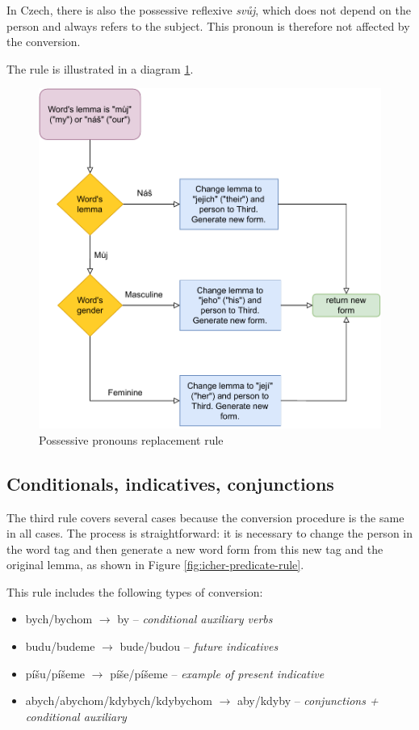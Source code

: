 In Czech, there is also the possessive reflexive \emph{svůj}, which does not depend on the person and always refers to the subject. \cite{Karlik2017} This pronoun is therefore not affected by the conversion.

The rule is illustrated in a diagram \ref{fig:icher-posspron-rule}.

\begin{figure}[!htbp]
\includegraphics[width=\textwidth]{data/Icher-Posspron-Rule.pdf}
\caption{Possessive pronouns replacement rule}
\label{fig:icher-posspron-rule}
\end{figure}

\subsection{Conditionals, indicatives, conjunctions}

The third rule covers several cases because the conversion procedure is the same in all cases. The process is straightforward: it is necessary to change the person in the word tag and then generate a new word form from this new tag and the original lemma, as shown in Figure \ref{fig:icher-predicate-rule}.

This rule includes the following types of conversion:
\begin{itemize}
	\item bych/bychom $\rightarrow$ by -- \emph{conditional auxiliary verbs}
	\item budu/budeme $\rightarrow$ bude/budou -- \emph{future indicatives}
	\item píšu/píšeme $\rightarrow$ píše/píšeme -- \emph{example of present indicative}
	\item abych/abychom/kdybych/kdybychom $\rightarrow$ aby/kdyby -- \emph{conjunctions + conditional auxiliary}
\end{itemize}



